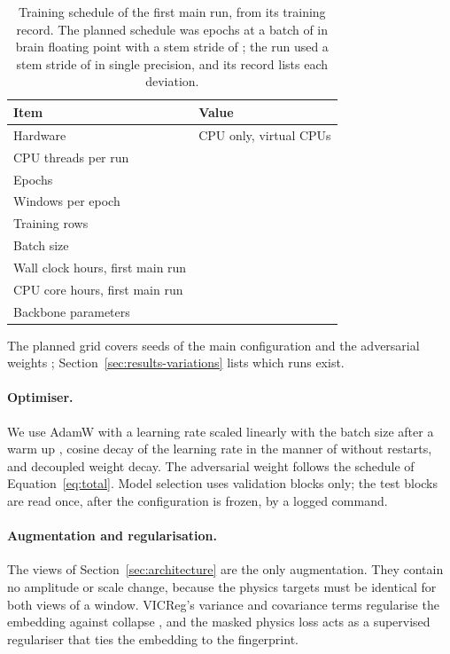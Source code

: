 \begin{table}[tbp]
\centering
\caption{Training schedule of the first main run, from its training record. The planned schedule was \PlannedEpochs{} epochs at a batch of \PlannedBatch{} in brain floating point with a stem stride of \PlannedStemStride; the run used a stem stride of \UsedStemStride{} in single precision, and its record lists each deviation.}
\label{tab:training}
\footnotesize
\begin{tabular}{@{}ll@{}}
\toprule
Item & Value \\
\midrule
Hardware & CPU only, \ThruCpuCount{} virtual CPUs \\
CPU threads per run & \TrainThreads{} \\
Epochs & \TrainEpochs{} \\
Windows per epoch & \TrainWindowsPerEpoch{} \\
Training rows & \TrainRows{} \\
Batch size & \TrainBatch{} \\
Wall clock hours, first main run & \TrainHours{} \\
CPU core hours, first main run & \TrainCoreHours{} \\
Backbone parameters & \EncoderParams{} \\
\bottomrule
\end{tabular}
\end{table} The
planned grid covers seeds \ConfigSeeds{} of the main configuration and the adversarial weights
\ConfigLambdas; Section~\ref{sec:results-variations} lists which runs exist.

\paragraph{Optimiser.} We use AdamW \citep{loshchilov2017} with a learning rate scaled linearly
with the batch size after a warm up \citep{goyal2017}, cosine decay of the learning rate in the manner of \citet{loshchilov2016} without restarts, and
decoupled weight decay. The adversarial weight follows the schedule of Equation~\eqref{eq:total}.
Model selection uses validation blocks only; the test blocks are read once, after the
configuration is frozen, by a logged command.

\paragraph{Augmentation and regularisation.} The views of Section~\ref{sec:architecture} are the
only augmentation. They contain no amplitude or scale change, because the physics targets must be
identical for both views of a window. VICReg's variance and covariance terms regularise the
embedding against collapse \citep{bardes2021}, and the masked physics loss acts as a supervised
regulariser that ties the embedding to the fingerprint.
